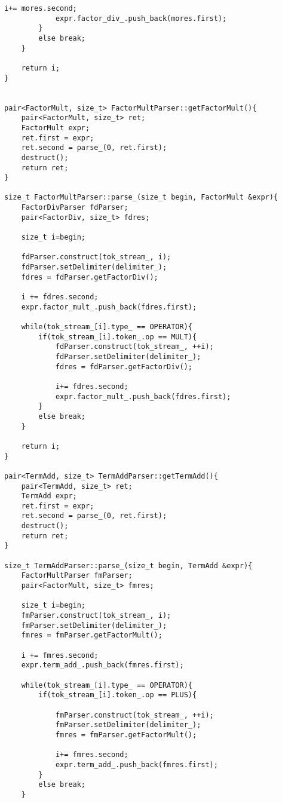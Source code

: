 \documentclass[pdftex,12pt,letterpaper,notitlepage,twoside]{article}
\begin{document}
\begin{lstlisting}[frame=single,caption={C program for testing}]
            i+= mores.second;
            expr.factor_div_.push_back(mores.first);
        }
        else break;
    }

    return i;
}


pair<FactorMult, size_t> FactorMultParser::getFactorMult(){
    pair<FactorMult, size_t> ret;
    FactorMult expr;
    ret.first = expr;
    ret.second = parse_(0, ret.first);
    destruct();
    return ret;
}

size_t FactorMultParser::parse_(size_t begin, FactorMult &expr){
    FactorDivParser fdParser;
    pair<FactorDiv, size_t> fdres;

    size_t i=begin;

    fdParser.construct(tok_stream_, i);
    fdParser.setDelimiter(delimiter_);
    fdres = fdParser.getFactorDiv();

    i += fdres.second;
    expr.factor_mult_.push_back(fdres.first);
    
    while(tok_stream_[i].type_ == OPERATOR){
        if(tok_stream_[i].token_.op == MULT){
            fdParser.construct(tok_stream_, ++i);
            fdParser.setDelimiter(delimiter_);
            fdres = fdParser.getFactorDiv();
            
            i+= fdres.second;
            expr.factor_mult_.push_back(fdres.first);
        }
        else break;
    }

    return i;
}

pair<TermAdd, size_t> TermAddParser::getTermAdd(){
    pair<TermAdd, size_t> ret;
    TermAdd expr;
    ret.first = expr;
    ret.second = parse_(0, ret.first);
    destruct();
    return ret;
}

size_t TermAddParser::parse_(size_t begin, TermAdd &expr){
    FactorMultParser fmParser;
    pair<FactorMult, size_t> fmres;

    size_t i=begin;
    fmParser.construct(tok_stream_, i);
    fmParser.setDelimiter(delimiter_);
    fmres = fmParser.getFactorMult();

    i += fmres.second;
    expr.term_add_.push_back(fmres.first);
    
    while(tok_stream_[i].type_ == OPERATOR){
        if(tok_stream_[i].token_.op == PLUS){

            fmParser.construct(tok_stream_, ++i);
            fmParser.setDelimiter(delimiter_);
            fmres = fmParser.getFactorMult();
            
            i+= fmres.second;
            expr.term_add_.push_back(fmres.first);
        }
        else break;
    }


\end{lstlisting}
\end{document}
